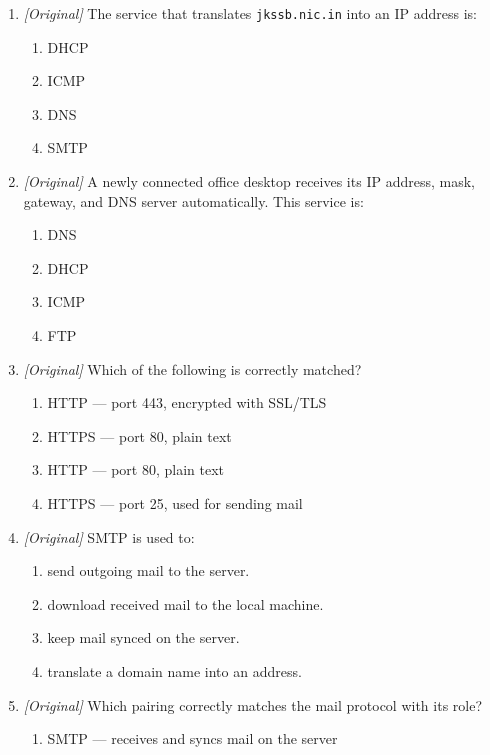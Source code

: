\begin{enumerate}[label=\textbf{Q\arabic*.}, leftmargin=*]
\begin{enumerate}[label=\Alph*.]
    \item ping and mail merge
  \end{enumerate}
\item \textit{[Original]} The service that translates
  \texttt{jkssb.nic.in} into an IP address is:
  \begin{enumerate}[label=\Alph*.]
    \item DHCP
    \item ICMP
    \item DNS
    \item SMTP
  \end{enumerate}
\item \textit{[Original]} A newly connected office desktop receives its IP
  address, mask, gateway, and DNS server automatically. This service is:
  \begin{enumerate}[label=\Alph*.]
    \item DNS
    \item DHCP
    \item ICMP
    \item FTP
  \end{enumerate}
\item \textit{[Original]} Which of the following is correctly matched?
  \begin{enumerate}[label=\Alph*.]
    \item HTTP --- port 443, encrypted with SSL/TLS
    \item HTTPS --- port 80, plain text
    \item HTTP --- port 80, plain text
    \item HTTPS --- port 25, used for sending mail
  \end{enumerate}
\item \textit{[Original]} SMTP is used to:
  \begin{enumerate}[label=\Alph*.]
    \item send outgoing mail to the server.
    \item download received mail to the local machine.
    \item keep mail synced on the server.
    \item translate a domain name into an address.
  \end{enumerate}
\item \textit{[Original]} Which pairing correctly matches the mail protocol
  with its role?
  \begin{enumerate}[label=\Alph*.]
    \item SMTP --- receives and syncs mail on the server

\end{enumerate}
\end{enumerate}
